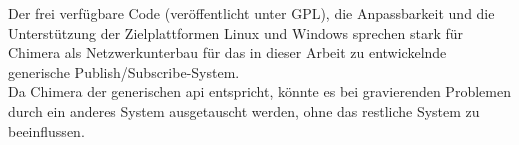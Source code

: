 Der frei verfügbare Code (veröffentlicht unter GPL), die Anpassbarkeit und die Unterstützung der Zielplattformen Linux und Windows sprechen stark für Chimera als Netzwerkunterbau für das in dieser Arbeit zu entwickelnde generische Publish/Subscribe-System.\\
Da Chimera der generischen \ac{api} entspricht, könnte es bei gravierenden Problemen durch ein anderes System ausgetauscht werden, ohne das restliche System zu beeinflussen.
